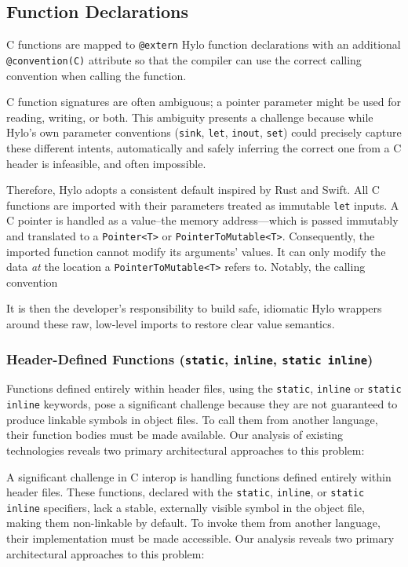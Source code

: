 \subsection{Function Declarations}
C functions are mapped to \texttt{@extern} Hylo function declarations with an additional \texttt{@convention(C)} attribute so that the compiler can use the correct calling convention when calling the function.

C function signatures are often ambiguous; a pointer parameter might be used for reading, writing, or both. This ambiguity presents a challenge because while Hylo's own parameter conventions (\texttt{sink}, \texttt{let}, \texttt{inout}, \texttt{set}) could precisely capture these different intents, automatically and safely inferring the correct one from a C header is infeasible, and often impossible.

Therefore, Hylo adopts a consistent default inspired by Rust and Swift. All C functions are imported with their parameters treated as immutable \texttt{let} inputs. A C pointer is handled as a value--the memory address—which is passed immutably and translated to a \texttt{Pointer<T>} or \texttt{PointerToMutable<T>}. Consequently, the imported function cannot modify its arguments' values. It can only modify the data \textit{at} the location a \texttt{PointerToMutable<T>} refers to. Notably, the calling convention 

It is then the developer's responsibility to build safe, idiomatic Hylo wrappers around these raw, low-level imports to restore clear value semantics.

\subsubsection{Header-Defined Functions (\texttt{static}, \texttt{inline}, \texttt{static inline})}
\label{handling_inline_c_functions}

Functions defined entirely within header files, using the \texttt{static}, \texttt{inline} or \texttt{static inline} keywords, pose a significant challenge because they are not guaranteed to produce linkable symbols in object files. To call them from another language, their function bodies must be made available. Our analysis of existing technologies reveals two primary architectural approaches to this problem:

A significant challenge in C interop is handling functions defined entirely within header files. These functions, declared with the \texttt{static}, \texttt{inline}, or \texttt{static inline} specifiers, lack a stable, externally visible symbol in the object file, making them non-linkable by default. To invoke them from another language, their implementation must be made accessible. Our analysis reveals two primary architectural approaches to this problem:

